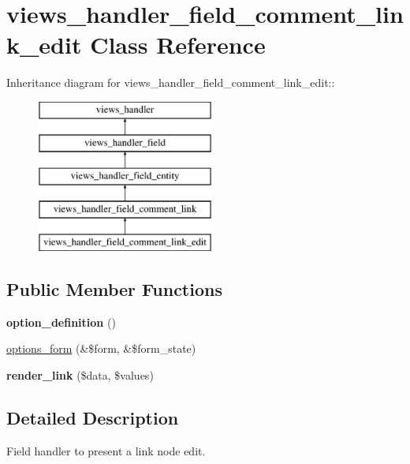 \hypertarget{classviews__handler__field__comment__link__edit}{
\section{views\_\-handler\_\-field\_\-comment\_\-link\_\-edit Class Reference}
\label{classviews__handler__field__comment__link__edit}
}
Inheritance diagram for views\_\-handler\_\-field\_\-comment\_\-link\_\-edit::\begin{figure}[H]
\begin{center}
\leavevmode
\includegraphics[height=5cm]{classviews__handler__field__comment__link__edit}
\end{center}
\end{figure}
\subsection*{Public Member Functions}
\begin{DoxyCompactItemize}
\item 
\hypertarget{classviews__handler__field__comment__link__edit_add1f387461983bd532a7d55eff1af516}{
{\bfseries option\_\-definition} ()}
\label{classviews__handler__field__comment__link__edit_add1f387461983bd532a7d55eff1af516}

\item 
\hyperlink{classviews__handler__field__comment__link__edit_acabe2521c15d2c3d8e48cff803bb3def}{options\_\-form} (\&\$form, \&\$form\_\-state)
\item 
\hypertarget{classviews__handler__field__comment__link__edit_a25fc0048a2657ccbcb46aaf174b89701}{
{\bfseries render\_\-link} (\$data, \$values)}
\label{classviews__handler__field__comment__link__edit_a25fc0048a2657ccbcb46aaf174b89701}

\end{DoxyCompactItemize}


\subsection{Detailed Description}
Field handler to present a link node edit. 


